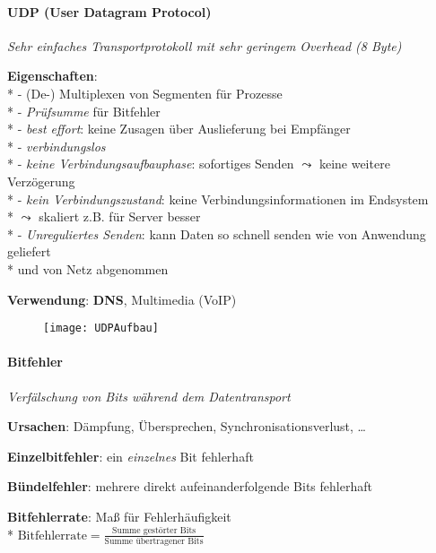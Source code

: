 \paragraph{UDP (User Datagram Protocol)}
\begin{items}
  \item \emph{Sehr einfaches Transportprotokoll mit sehr geringem Overhead (8 Byte)}
  \item \textbf{Eigenschaften}: \\*
    - (De-) Multiplexen von Segmenten für Prozesse \\*
    - \emph{Prüfsumme} für Bitfehler \\*
    - \emph{best effort}: keine Zusagen über Auslieferung bei Empfänger \\*
    - \emph{verbindungslos} \\*
    - \emph{keine Verbindungsaufbauphase}: sofortiges Senden \( \leadsto \) keine weitere Verzögerung \\*
    - \emph{kein Verbindungszustand}: keine Verbindungsinformationen im Endsystem \\* \phantom{-} \( \leadsto \) skaliert z.B. für Server besser\\*
    - \emph{Unreguliertes Senden}: kann Daten so schnell senden wie von Anwendung geliefert \\* \phantom{-} und von Netz abgenommen
  \item \textbf{Verwendung}: \textbf{DNS}, Multimedia (VoIP)
\end{items}
\begin{figure}[H]\centering\label{UDPAufbau}\texttt{[image: UDPAufbau]}\end{figure}

\pagebreak

\paragraph{Bitfehler}
\begin{items}
  \item \emph{Verfälschung von Bits während dem Datentransport}
  \item \textbf{Ursachen}: Dämpfung, Übersprechen, Synchronisationsverlust, \dots
  \item \textbf{Einzelbitfehler}: ein \emph{einzelnes} Bit fehlerhaft
  \item \textbf{Bündelfehler}: mehrere direkt aufeinanderfolgende Bits fehlerhaft
    \item \textbf{Bitfehlerrate}: Maß für Fehlerhäufigkeit \\*
  \( \text{Bitfehlerrate} = \tfrac{\text{Summe gestörter Bits}}{\text{Summe übertragener Bits}} \)
\end{items}


